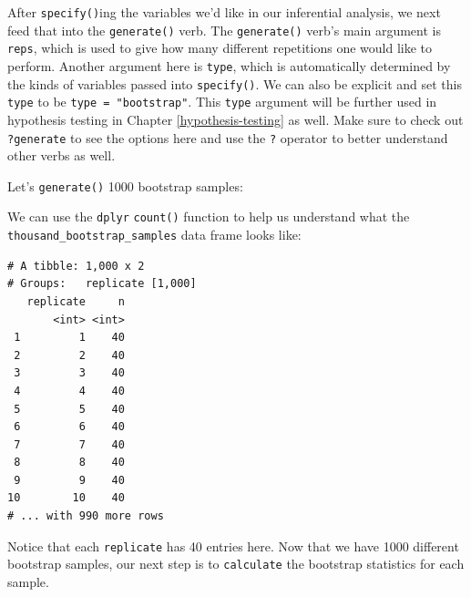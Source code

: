 \documentclass[12pt,]{krantz}
\makeatletter
\newenvironment{Shaded}{\begin{snugshade}}{\end{snugshade}}
\newcommand{\KeywordTok}[1]{\textcolor[rgb]{0.27,0.27,0.27}{\textbf{#1}}}
\newcommand{\DataTypeTok}[1]{\textcolor[rgb]{0.27,0.27,0.27}{#1}}
\newcommand{\DecValTok}[1]{\textcolor[rgb]{0.06,0.06,0.06}{#1}}
\newcommand{\StringTok}[1]{\textcolor[rgb]{0.5,0.5,0.5}{#1}}
\newcommand{\OperatorTok}[1]{\textcolor[rgb]{0.43,0.43,0.43}{\textbf{#1}}}
\newcommand{\NormalTok}[1]{#1}
\newenvironment{kframe}{%
\medskip{}
\setlength{\fboxsep}{.8em}
 \def\at@end@of@kframe{}%
 \ifinner\ifhmode%
  \def\at@end@of@kframe{\end{minipage}}%
  \begin{minipage}{\columnwidth}%
 \fi\fi%
 \def\FrameCommand##1{\hskip\@totalleftmargin \hskip-\fboxsep
 \colorbox{shadecolor}{##1}\hskip-\fboxsep
     \hskip-\linewidth \hskip-\@totalleftmargin \hskip\columnwidth}%
 \MakeFramed {\advance\hsize-\width
   \@totalleftmargin\z@ \linewidth\hsize
   \@setminipage}}%
 {\par\unskip\endMakeFramed%
 \at@end@of@kframe}
\renewenvironment{Shaded}{\begin{kframe}}{\end{kframe}}
\makeatother
\begin{document}
After \texttt{specify()}ing the variables we'd like in our inferential
analysis, we next feed that into the \texttt{generate()} verb. The
\texttt{generate()} verb's main argument is \texttt{reps}, which is used
to give how many different repetitions one would like to perform.
Another argument here is \texttt{type}, which is automatically
determined by the kinds of variables passed into \texttt{specify()}. We
can also be explicit and set this \texttt{type} to be
\texttt{type\ =\ "bootstrap"}. This \texttt{type} argument will be
further used in hypothesis testing in Chapter \ref{hypothesis-testing}
as well. Make sure to check out \texttt{?generate} to see the options
here and use the \texttt{?} operator to better understand other verbs as
well.

Let's \texttt{generate()} 1000 bootstrap samples:

\begin{Shaded}
\end{Shaded}

We can use the \texttt{dplyr} \texttt{count()} function to help us
understand what the \texttt{thousand\_bootstrap\_samples} data frame
looks like:

\begin{Shaded}
\end{Shaded}

\begin{verbatim}
# A tibble: 1,000 x 2
# Groups:   replicate [1,000]
   replicate     n
       <int> <int>
 1         1    40
 2         2    40
 3         3    40
 4         4    40
 5         5    40
 6         6    40
 7         7    40
 8         8    40
 9         9    40
10        10    40
# ... with 990 more rows
\end{verbatim}

Notice that each \texttt{replicate} has 40 entries here. Now that we
have 1000 different bootstrap samples, our next step is to
\texttt{calculate} the bootstrap statistics for each sample.
\end{document}
